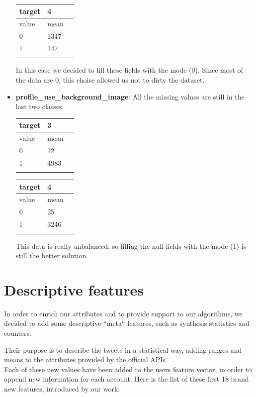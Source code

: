 \begin{itemize}
\begin{center}
		\begin{tabular}{lll}
			\\target&4\\
			\hline\hline
			value&mean\\
			\hline\hline
			0&1347\\
			1&147\\\hline\\
		\end{tabular}
	\end{center}
	In this case we decided to fill these fields with the mode (0). Since most of the data are 0, this choise allowed us not to dirty the dataset.
	
	
	\item[\PencilRight]\textbf{profile\_use\_background\_image}: All the missing values are still in the last two classes.
	\begin{center}
		\begin{tabular}{lll}
			\\target&3\\
			\hline\hline
			value&mean\\
			\hline\hline
			0&12\\
			1&4983\\\hline\\
		\end{tabular}
		
		\begin{tabular}{lll}
			\\target&4\\
			\hline\hline
			value&mean\\
			\hline\hline
			0&25\\
			1&3246\\\hline\\
		\end{tabular}
	\end{center}
	This data is really unbalanced, so filling the null fields with the mode (1) is still the better solution.
	
\end{itemize}
\section{Descriptive features}

In order to enrich our attributes and to provide support to our algorithms, we decided to add some descriptive ``meta`` features, such as synthesis statistics and counters.

Their purpose is to describe the tweets in a statistical way, adding ranges and means to the attributes provided by the official APIs.\\
Each of these new values have been added to the users feature vector, in order to append new information for each account.
Here is the list of these first 18 brand new features, introduced by our work:

